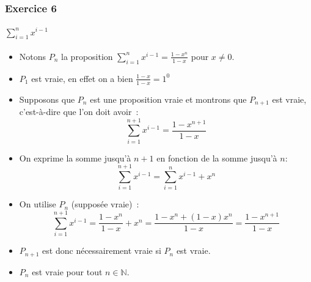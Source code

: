 \documentclass[10pt,notheorems]{beamer}
\theoremstyle{plain}
\theoremstyle{definition} %
\begin{document}
\begin{frame}
  \frametitle{Exercice 6}
  \framesubtitle{$\sum_{i=1}^n x^{i-1}$}
  \fontsize{8}{10}\selectfont

  \begin{itemize}

  \item Notons $P_n$ la proposition $\sum_{i=1}^n x^{i-1} = \frac{1-x^n}{1-x}$ pour $x\neq 0$.\newline

  \item $P_1$ est vraie, en effet on a bien $\frac{1-x}{1-x} = 1^0$\newline

  \item Supposons que $P_n$ est une proposition vraie et montrons que $P_{n+1}$ est vraie, c'est-à-dire  que l'on doit avoir~:
    \[
      \sum_{i=1}^{n+1} x^{i-1} = \frac{1-x^{n+1}}{1-x}
    \]

  \item On exprime la somme jusqu'à $n+1$ en fonction de la somme jusqu'à $n$:
    \[
      \sum_{i=1}^{n+1} x^{i-1} = \sum_{i=1}^{n} x^{i-1} + x^n
    \]

  \item On utilise $P_n$ (supposée vraie)~:
    \[
        \sum_{i=1}^{n+1} x^{i-1} = \frac{1-x^n}{1-x} + x^n = \frac{1-x^n+(1-x)x^n}{1-x} = \frac{1-x^{n+1}}{1-x}
    \]

  \item $P_{n+1}$ est donc nécessairement vraie si $P_{n}$ est vraie.\newline

  \item $P_n$ est vraie pour tout $n\in\mathbb N$.

  \end{itemize}

\end{frame}
\end{document}
